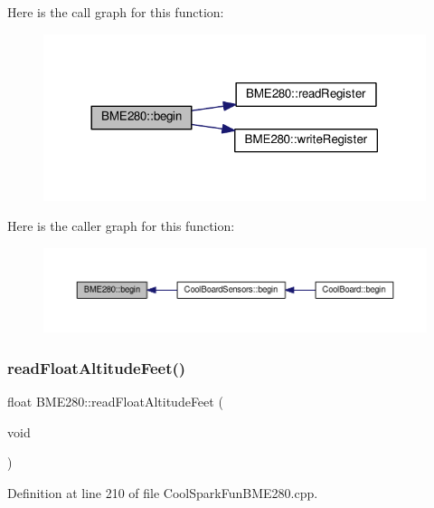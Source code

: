 Here is the call graph for this function\+:\nopagebreak
\begin{figure}[H]
\begin{center}
\leavevmode
\includegraphics[width=317pt]{class_b_m_e280_a994c102f010547f9c740a338ef9905c7_cgraph}
\end{center}
\end{figure}
Here is the caller graph for this function\+:\nopagebreak
\begin{figure}[H]
\begin{center}
\leavevmode
\includegraphics[width=350pt]{class_b_m_e280_a994c102f010547f9c740a338ef9905c7_icgraph}
\end{center}
\end{figure}
\mbox{\label{class_b_m_e280_a6525c8a26f887b52596c86bed99343cb}} 
\subsubsection{\texorpdfstring{read\+Float\+Altitude\+Feet()}{readFloatAltitudeFeet()}}
{\footnotesize\ttfamily float B\+M\+E280\+::read\+Float\+Altitude\+Feet (\begin{DoxyParamCaption}\item[{void}]{ }\end{DoxyParamCaption})}



Definition at line 210 of file Cool\+Spark\+Fun\+B\+M\+E280.\+cpp.

